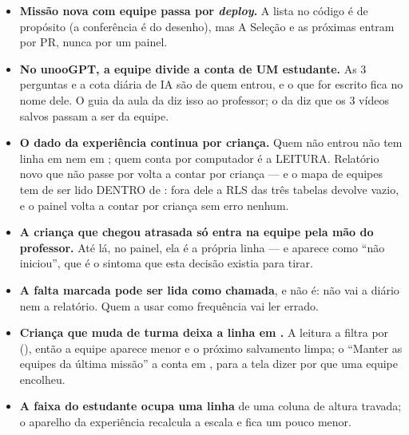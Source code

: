 \begin{itemize}
  \item \textbf{Missão nova com equipe passa por \emph{deploy}.} A lista no
    código é de propósito (a conferência é do desenho), mas A Seleção e as
    próximas entram por PR, nunca por um painel.
  \item \textbf{No unooGPT, a equipe divide a conta de UM estudante.} As 3
    perguntas e a cota diária de IA são de quem entrou, e o que for escrito fica
    no nome dele. O guia da aula da  diz isso ao professor; o da
     diz que os 3 vídeos salvos passam a ser da equipe.
  \item \textbf{O dado da experiência continua por criança.} Quem não entrou não
    tem linha em  nem em ; quem
    conta por computador é a LEITURA. Relatório novo que não passe por
     volta a contar por criança --- e o mapa de equipes
    tem de ser lido DENTRO de : fora dele a RLS das três tabelas
    devolve vazio, e o painel volta a contar por criança sem erro nenhum.
  \item \textbf{A criança que chegou atrasada só entra na equipe pela mão do
    professor.} Até lá, no painel, ela é a própria linha --- e aparece como
    \enquote{não iniciou}, que é o sintoma que esta decisão existia para tirar.
  \item \textbf{A falta marcada pode ser lida como chamada}, e não é: não vai a
    diário nem a relatório. Quem a usar como frequência vai ler errado.
  \item \textbf{Criança que muda de turma deixa a linha em
    .} A leitura a filtra por 
    (), então a equipe aparece menor e o próximo
    salvamento limpa; o \enquote{Manter as equipes da última missão} a conta em
    , para a tela dizer por que uma equipe encolheu.
  \item \textbf{A faixa do estudante ocupa uma linha} de uma coluna de altura
    travada; o aparelho da experiência recalcula a escala e fica um pouco menor.
\end{itemize}

